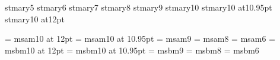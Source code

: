 %
\def\plstmaryversion{0.5a}%
\edef\restorestmarycatcodes{%
   \catcode`\noexpand\@=\number\catcode`\@\relax
   \catcode`\noexpand\!=\number\catcode`\!\relax}%
%
\newfam\stmaryrdfam
%
\font\stmaryfive    stmary5
\font\stmarysix     stmary6
\font\stmaryseven   stmary7
\font\stmaryeight   stmary8
\font\stmarynine    stmary9
\font\stmaryten     stmary10
\font\stmaryeleven  stmary10 at10.95pt
\font\stmarytwelve  stmary10 at12pt
%
%

\font\twelvemsa = msam10 at 12pt
\font\elevenmsa = msam10 at 10.95pt
\font\ninemsa   = msam9
\font\eightmsa  = msam8
\font\sixmsa    = msam6
\font\twelvemsb = msbm10 at 12pt
\font\elevenmsb = msbm10 at 10.95pt
\font\ninemsb   = msbm9
\font\eightmsb  = msbm8
\font\sixmsb    = msbm6
%
\def\stmaryrdeightpoint{%
          \textfont\stmaryrdfam \stmaryeight
        \scriptfont\stmaryrdfam \stmarysix
  \scriptscriptfont\stmaryrdfam \stmaryfive
  \amseightpoint
}%
\def\amseightpoint{%
          \textfont\msafam \eightmsa
        \scriptfont\msafam \sixmsa
  \scriptscriptfont\msafam \fivemsa
          \textfont\msbfam \eightmsb
        \scriptfont\msbfam \sixmsb
  \scriptscriptfont\msbfam \fivemsb
}%
%
\def\stmaryrdninepoint{%
          \textfont\stmaryrdfam \stmarynine
        \scriptfont\stmaryrdfam \stmaryseven
  \scriptscriptfont\stmaryrdfam \stmaryfive
  \amsninepoint
}%
\def\amsninepoint{%
          \textfont\msafam \ninemsa
        \scriptfont\msafam \sevenmsa
  \scriptscriptfont\msafam \fivemsa
          \textfont\msbfam \ninemsb
        \scriptfont\msbfam \sevenmsb
  \scriptscriptfont\msbfam \fivemsb
}%
%
\def\stmaryrdtenpoint{%
          \textfont\stmaryrdfam \stmaryten
        \scriptfont\stmaryrdfam \stmaryseven
  \scriptscriptfont\stmaryrdfam \stmaryfive
  \amstenpoint
}%
\def\amstenpoint{%
          \textfont\msafam \tenmsa
        \scriptfont\msafam \sevenmsa
  \scriptscriptfont\msafam \fivemsa
          \textfont\msbfam \tenmsb
        \scriptfont\msbfam \sevenmsb
  \scriptscriptfont\msbfam \fivemsb
}%
%
\def\stmaryrdelevenpoint{%
          \textfont\stmaryrdfam \stmaryeleven
        \scriptfont\stmaryrdfam \stmaryeight
  \scriptscriptfont\stmaryrdfam \stmarysix
  \amselevenpoint
}%
\def\amselevenpoint{%
          \textfont\msafam \elevenmsa
        \scriptfont\msafam \eightmsa
  \scriptscriptfont\msafam \sixmsa
          \textfont\msbfam \elevenmsb
        \scriptfont\msbfam \eightmsb
  \scriptscriptfont\msbfam \sixmsb
}%
%
\def\stmaryrdtwelvepoint{%
          \textfont\stmaryrdfam \stmarytwelve
        \scriptfont\stmaryrdfam \stmaryeight
  \scriptscriptfont\stmaryrdfam \stmarysix
  \amstwelvepoint
}%
